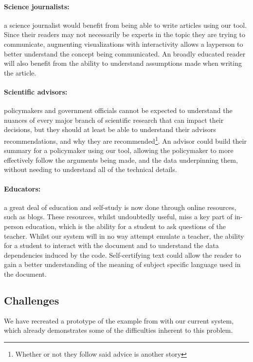 \paragraph{Science journalists:} a science journalist would benefit from being able to write articles using our tool.
Since their readers may not necessarily be experts in the topic they are trying to communicate, augmenting visualizations
with interactivity allows a layperson to better understand the concept being communicated. An broadly educated reader
will also benefit from the ability to understand assumptions made when writing the article.

\paragraph{Scientific advisors:} policymakers and government officials cannot be expected to understand the nuances of
every major branch of scientific research that can impact their decisions, but they should at least be able to
understand their advisors recommendations, and why they are recommended\footnote{Whether or not they follow said advice is another story}.
An advisor could build their summary for a policymaker using our tool, allowing the policymaker to more effectively
follow the arguments being made, and the data underpinning them, without needing to understand all of the technical details. 

\paragraph{Educators:} a great deal of education and self-study is now done through online resources, such as blogs.
These resources, whilst undoubtedly useful, miss a key part of in-person education, which is the ability for a student
to ask questions of the teacher. Whilst our system will in no way attempt emulate a teacher, the ability for a student
to interact with the document and to understand the data dependencies induced by the code. Self-certifying text could
allow the reader to gain a better understanding of the meaning of subject specific language used in the document. 

\subsection{Challenges}

We have recreated a prototype of the example from  with our current system, which already demonstrates
some of the difficulties inherent to this problem.

